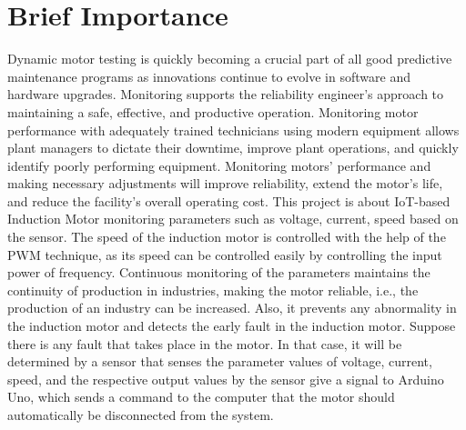 \section{Brief Importance}
Dynamic motor testing is quickly becoming a crucial part of all good predictive maintenance programs as innovations continue to evolve in software and hardware upgrades. Monitoring supports the reliability engineer's approach to maintaining a safe, effective, and productive operation. Monitoring motor performance with adequately trained technicians using modern equipment allows plant managers to dictate their downtime, improve plant operations, and quickly identify poorly performing equipment. Monitoring motors' performance and making necessary adjustments will improve reliability, extend the motor's life, and reduce the facility's overall operating cost.
This project is about IoT-based Induction Motor monitoring parameters such as voltage, current, speed based on the sensor. The speed of the induction motor is controlled with the help of the PWM technique, as its speed can be controlled easily by controlling the input power of frequency. Continuous monitoring of the parameters maintains the continuity of production in industries, making the motor reliable, i.e., the production of an industry can be increased. Also, it prevents any abnormality in the induction motor and detects the early fault in the induction motor. 
Suppose there is any fault that takes place in the motor. In that case, it will be determined by a sensor that senses the parameter values of voltage, current, speed, and the respective output values by the sensor give a signal to Arduino Uno, which sends a command to the computer that the motor should automatically be disconnected from the system.
